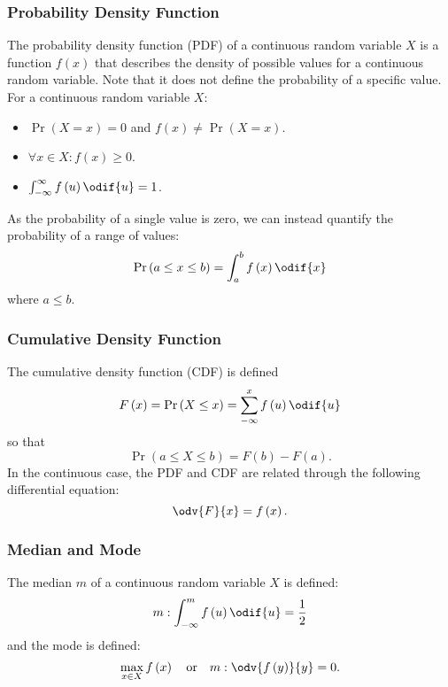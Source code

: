 \documentclass{article}
\begin{document}
\subsubsection{Probability Density Function}
The probability density function (PDF) of a continuous random variable
\(X\) is a function \(f\left( x \right)\) that describes the density of
possible values for a continuous random variable. Note that it does not
define the probability of a specific value. For a continuous random
variable \(X\):
\begin{itemize}
    \item \(\Pr{\left( X = x \right)} = 0\) and \(f\left( x \right) \neq \Pr{\left( X = x \right)}\).
    \item \(\forall x \in X : f\left( x \right) \geq 0\).
    \item \(\int_{-\infty}^\infty f\left( u \right) \odif{u} = 1\).
\end{itemize}
As the probability of a single value is zero, we can instead quantify
the probability of a range of values:
\begin{equation*}
    \Pr{\left( a \leq x \leq b \right)} = \int_{a}^{b} f\left( x \right) \odif{x}
\end{equation*}
where \(a \leq b\).
\subsubsection{Cumulative Density Function}
The cumulative density function (CDF) is defined
\begin{equation*}
    F\left( x \right) = \Pr{\left( X \leq x \right)} = \sum_{-\infty}^x f\left( u \right) \odif{u}
\end{equation*}
so that
\begin{equation*}
    \Pr{\left( a \leq X \leq b \right)} = F\left( b \right) - F\left( a \right).
\end{equation*}
In the continuous case, the PDF and CDF are related through the
following differential equation:
\begin{equation*}
    \odv{F}{x} = f\left( x \right).
\end{equation*}
\subsubsection{Median and Mode}
The median \(m\) of a continuous random variable \(X\) is defined:
\begin{equation*}
    m : \int_{-\infty}^m f\left( u \right) \odif{u} = \frac{1}{2}
\end{equation*}
and the mode is defined:
\begin{equation*}
    \max_{x \in X} f\left( x \right) \quad \text{or} \quad m:\odv{f\left( y \right)}{y} = 0.
\end{equation*}
\end{document}
